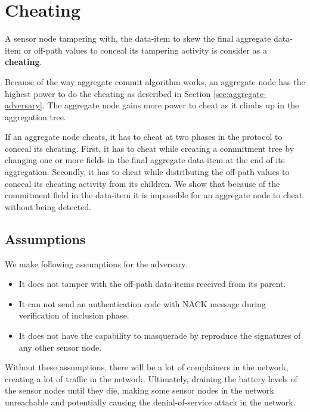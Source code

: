 \chapter{Cheating}
	
	\begin{definition}
		A sensor node tampering with, the data-item to skew the final aggregate data-item or  off-path values to conceal its tampering activity is consider as a \textbf{cheating}.	
	\end{definition}
	Because of the way aggregate commit algorithm works, an aggregate node has the highest power to do the cheating as described in Section \ref{sec:aggregate-adversary}. 
	The aggregate node gains more power to cheat as it climbs up in the aggregation tree.
	
	If an aggregate node cheats, it has to cheat at two phases in the protocol to conceal its cheating.
	First, it has to cheat while creating a commitment tree by changing one or more fields in the final aggregate data-item at the end of its aggregation.
	Secondly, it has to cheat while distributing the off-path values to conceal its cheating activity from its children.
	We show that because of the commitment field in the data-item it is impossible for an aggregate node to cheat without being detected.
	\section{Assumptions}
	We make following assumptions for the adversary.
		\begin{itemize}
			\item It does not tamper with the off-path data-items received from its parent.
			\item It can not send an authentication code with NACK message during verification of inclusion phase.
			\item It does not have the capability to masquerade by reproduce the signatures of any other sensor node.
		\end{itemize}
	Without these assumptions, there will be a lot of complainers in the network, creating a lot of traffic in the network.
	Ultimately, draining the battery levels of the sensor nodes until they die, making some sensor nodes in the network unreachable and potentially causing the denial-of-service attack in the network.

